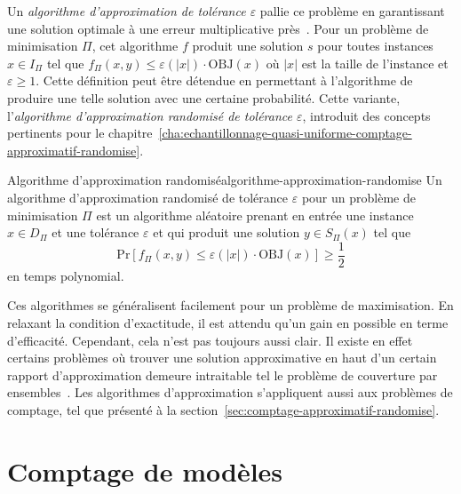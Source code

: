 Un \textit{algorithme d'approximation de tolérance $\varepsilon$} pallie ce problème en garantissant une solution optimale à une erreur multiplicative près~\cite{vaziraniApproximationAlgorithms2003}. Pour un problème de minimisation $\Pi$, cet algorithme $f$ produit une solution $s$ pour toutes instances $x \in I_{\Pi}$ tel que $f_{\Pi}(x, y) \leq \varepsilon(\lvert x \rvert ) \cdot \text{OBJ}(x)$ où $\lvert  x \rvert $ est la taille de l'instance et $\varepsilon \geq 1   $. Cette définition peut être détendue en permettant à l'algorithme de produire une telle solution avec une certaine probabilité. Cette variante, l'\textit{algorithme d'approximation randomisé de tolérance $\varepsilon$}, introduit des concepts pertinents pour le chapitre~\ref{cha:echantillonnage-quasi-uniforme-comptage-approximatif-randomise}.


\begin{subtheorem}{Algorithme d'approximation randomisé}{algorithme-approximation-randomise}
    Un algorithme d'approximation randomisé de tolérance $\varepsilon$ pour un problème de minimisation $\Pi$ est un algorithme aléatoire prenant en entrée une instance $x \in D_{\Pi}$ et une tolérance $\varepsilon$ et qui produit une solution $y \in S_{\Pi}(x)$ tel que
    \begin{equation*}
        \mathrm{ Pr } [f_{\Pi}(x, y) \leq \varepsilon(\lvert x \rvert ) \cdot \text{OBJ}(x)] \geq \frac{1}{2}
    \end{equation*}
    en temps polynomial.
\end{subtheorem}

Ces algorithmes se généralisent facilement pour un problème de maximisation.
En relaxant la condition d'exactitude, il est attendu qu'un gain en possible en terme d'efficacité. Cependant, cela n'est pas toujours aussi clair. Il existe en effet certains problèmes où trouver une solution approximative en haut d'un certain rapport d'approximation demeure intraitable tel le problème de couverture par ensembles~\cite{lundHardnessApproximatingMinimization1994}. Les algorithmes d'approximation s'appliquent aussi aux problèmes de comptage, tel que présenté à la section~\ref{sec:comptage-approximatif-randomise}.


\section{Comptage de modèles}
\label{sec:comptage-de-modeles}


